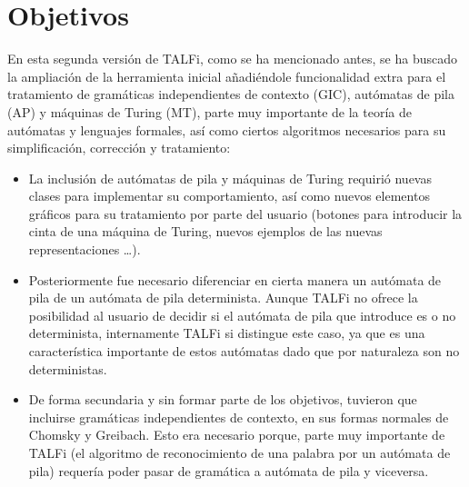 \documentclass[12pt,a4paper,spanish]{book}
\newcommand{\clearemptydoublepage}{\newpage{\pagestyle{empty}
\cleardoublepage}}
\begin{document}
\clearemptydoublepage
\chapter{Objetivos}
En esta segunda versi\'on de TALFi, como se ha mencionado antes, se ha buscado la ampliaci\'on de la herramienta inicial a\~nadi\'endole funcionalidad extra para el tratamiento de gram\'aticas independientes de contexto (GIC), aut\'omatas de pila (AP) y m\'aquinas de Turing (MT), parte muy importante de la teor\'ia de aut\'omatas y lenguajes formales, as\'i como ciertos algoritmos necesarios para su simplificaci\'on, correcci\'on y tratamiento:
\begin{itemize}
\item La inclusi\'on de aut\'omatas de pila y m\'aquinas de Turing requiri\'o nuevas clases para implementar su comportamiento, as\'i como nuevos elementos gr\'aficos para su tratamiento por parte del usuario (botones para introducir la cinta de una m\'aquina de Turing, nuevos ejemplos de las nuevas representaciones \ldots).
\item Posteriormente fue necesario diferenciar en cierta manera un aut\'omata de pila de un aut\'omata de pila determinista. Aunque TALFi no ofrece la posibilidad al usuario de decidir si el aut\'omata de pila que introduce es o no determinista, internamente TALFi si distingue este caso, ya que es una caracter\'istica importante de estos aut\'omatas dado que por naturaleza son no deterministas.
\item De forma secundaria y sin formar parte de los objetivos, tuvieron que incluirse gram\'aticas independientes de contexto, en sus formas normales de Chomsky y Greibach.
Esto era necesario porque, parte muy importante de TALFi (el algoritmo de reconocimiento de una palabra por un aut\'omata de pila) requer\'ia poder pasar de gram\'atica a aut\'omata de pila y viceversa.


\end{itemize}
\end{document}
